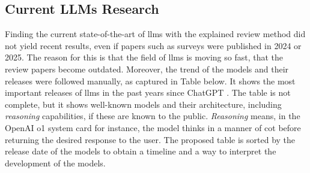 \subsection{Current LLMs Research}

 Finding the current state-of-the-art of \acp{llm} with the explained review method did not yield recent results, even if papers such as surveys were published in 2024 or 2025. The reason for this is that the field of \acp{llm} is moving so fast, that the review papers become outdated. Moreover, the trend of the models and their releases were followed manually, as captured in Table  below. It shows the most important releases of \acp{llm} in the past years since ChatGPT \cite{openai_introducing_2022}. The table is not complete, but it shows well-known models and their architecture, including \textit{reasoning} capabilities, if these are known to the public. \textit{Reasoning} means, in the OpenAI o1 system card \cite{openai_openai_2024-1} for instance, the model thinks in a manner of \ac{cot} before returning the desired response to the user. The proposed table is sorted by the release date of the models to obtain a timeline and a way to interpret the development of the models.

